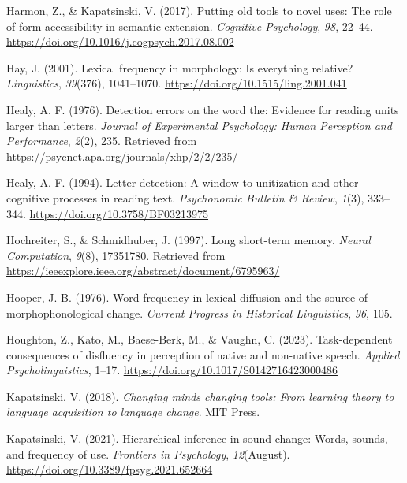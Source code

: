 \documentclass[
  man,floatsintext]{apa6}
\newlength{\cslhangindent}
\newenvironment{CSLReferences}[2] %
 {\begin{list}{}{%
  \setlength{\itemindent}{0pt}
  \setlength{\leftmargin}{0pt}
  \setlength{\parsep}{0pt}
  \ifodd #1
   \setlength{\leftmargin}{\cslhangindent}
   \setlength{\itemindent}{-1\cslhangindent}
  \fi
  \setlength{\itemsep}{#2\baselineskip}}}
 {\end{list}}
\begin{document}
\begin{CSLReferences}{1}{0}
Harmon, Z., \& Kapatsinski, V. (2017). Putting old tools to novel uses: The role of form accessibility in semantic extension. \emph{Cognitive Psychology}, \emph{98}, 22--44. \url{https://doi.org/10.1016/j.cogpsych.2017.08.002}

Hay, J. (2001). Lexical frequency in morphology: Is everything relative? \emph{Linguistics}, \emph{39}(376), 1041--1070. \url{https://doi.org/10.1515/ling.2001.041}

Healy, A. F. (1976). Detection errors on the word the: Evidence for reading units larger than letters. \emph{Journal of Experimental Psychology: Human Perception and Performance}, \emph{2}(2), 235. Retrieved from \url{https://psycnet.apa.org/journals/xhp/2/2/235/}

Healy, A. F. (1994). Letter detection: A window to unitization and other cognitive processes in reading text. \emph{Psychonomic Bulletin \& Review}, \emph{1}(3), 333--344. \url{https://doi.org/10.3758/BF03213975}

Hochreiter, S., \& Schmidhuber, J. (1997). Long short-term memory. \emph{Neural Computation}, \emph{9}(8), 17351780. Retrieved from \url{https://ieeexplore.ieee.org/abstract/document/6795963/}

Hooper, J. B. (1976). Word frequency in lexical diffusion and the source of morphophonological change. \emph{Current Progress in Historical Linguistics}, \emph{96}, 105.

Houghton, Z., Kato, M., Baese-Berk, M., \& Vaughn, C. (2023). Task-dependent consequences of disfluency in perception of native and non-native speech. \emph{Applied Psycholinguistics}, 1--17. \url{https://doi.org/10.1017/S0142716423000486}

Kapatsinski, V. (2018). \emph{Changing minds changing tools: From learning theory to language acquisition to language change}. MIT Press.

Kapatsinski, V. (2021). Hierarchical inference in sound change: Words, sounds, and frequency of use. \emph{Frontiers in Psychology}, \emph{12}(August). \url{https://doi.org/10.3389/fpsyg.2021.652664}


\end{CSLReferences}
\end{document}
